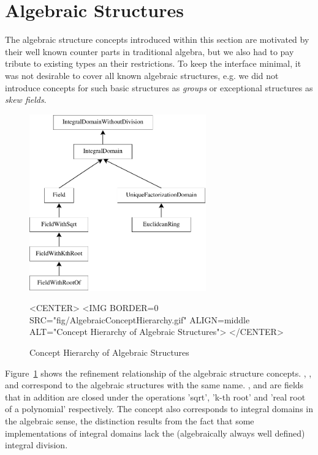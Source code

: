 
\section{Algebraic Structures}


The algebraic structure concepts introduced within this section are 
motivated by their well known counter parts in traditional algebra, 
but we also had to pay tribute to existing types an their restrictions. 
To keep the interface minimal,
it was not desirable to cover all known algebraic structures, 
e.g. we did not introduce concepts for such basic structures as {\em groups} or
exceptional structures as {\em skew fields}. 

\begin{figure}[htbp]
\begin{ccTexOnly}
\begin{center}
\includegraphics[width=3in]{Algebraic_foundations/fig/AlgebraicConceptHierarchy}
\end{center}
\end{ccTexOnly}
\caption{Concept Hierarchy of Algebraic Structures
\label{fig::ConceptHierarchyOfAlgebraicStructures}}

\begin{ccHtmlOnly}
<CENTER>
<IMG BORDER=0 SRC="fig/AlgebraicConceptHierarchy.gif" 
 ALIGN=middle ALT="Concept Hierarchy of Algebraic Structures">
</CENTER>
\end{ccHtmlOnly}
\end{figure}

Figure~\ref{fig::ConceptHierarchyOfAlgebraicStructures} shows the refinement 
relationship of the algebraic structure concepts. 
, ,   and 
 correspond to the algebraic structures with the
same name. ,  and 
 are fields that in addition are closed under 
the operations 'sqrt', 'k-th root' and 'real root of a polynomial' 
respectively. The concept  also
corresponds to integral domains in the algebraic sense, the
distinction results from the fact that some implementations of
integral domains lack the (algebraically always well defined) integral 
division.


